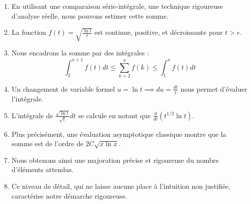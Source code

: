 \begin{enumerate}
    $$\mathbb{E}[B(x)] = \sum_{k=1}^x \mathbb{E}[I_k] = \sum_{k=1}^x p_k$$
    \item En utilisant une comparaison série-intégrale, une technique rigoureuse d'analyse réelle, nous pouvons estimer cette somme.
    \item La fonction $f(t) = \sqrt{\frac{\ln t}{t}}$ est continue, positive, et décroissante pour $t > e$.
    \item Nous encadrons la somme par des intégrales :
    $$\int_2^{x+1} f(t) dt \le \sum_{k=2}^x f(k) \le \int_1^x f(t) dt$$
    \item Un changement de variable formel $u = \ln t \implies du = \frac{dt}{t}$ nous permet d'évaluer l'intégrale.
    \item L'intégrale de $\frac{\sqrt{\ln t}}{\sqrt{t}} dt$ se calcule en notant que $\frac{d}{dt}(t^{1/2} \ln t)$.
    \item Plus précisément, une évaluation asymptotique classique montre que la somme est de l'ordre de $2C \sqrt{x \ln x}$.
    \item Nous obtenons ainsi une majoration précise et rigoureuse du nombre d'éléments attendus.
    \item Ce niveau de détail, qui ne laisse aucune place à l'intuition non justifiée, caractérise notre démarche rigoureuse.
\end{enumerate}
\newpage
